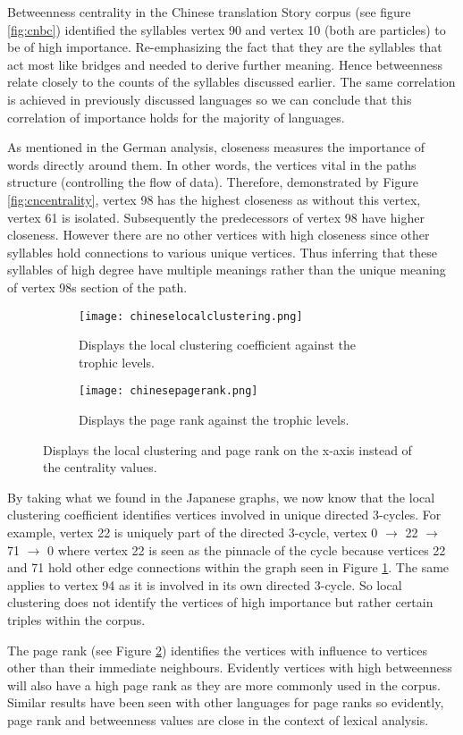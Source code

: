 Betweenness centrality in the Chinese translation Story corpus (see figure \ref{fig:cnbc}) identified the syllables vertex 90 and vertex 10 (both are particles) to be of high importance. Re-emphasizing the fact that they are the syllables that act most like bridges and needed to derive further meaning. Hence betweenness relate closely to the counts of the syllables discussed earlier. The same correlation is achieved in previously discussed languages so we can conclude that this correlation of importance holds for the majority of languages.

As mentioned in the German analysis, closeness measures the importance of words directly around them. In other words, the vertices vital in the paths structure (controlling the flow of data). Therefore, demonstrated by Figure \ref{fig:cncentrality}, vertex 98 has the highest closeness as without this vertex, vertex 61 is isolated. Subsequently the predecessors of vertex 98 have higher closeness. However there are no other vertices with high closeness since other syllables hold connections to various unique vertices. Thus inferring that these syllables of high degree have multiple meanings rather than the unique meaning of vertex 98s section of the path.

\begin{figure}[H]
\centering
\begin{subfigure}{.45\textwidth}
	\hspace{-1cm} 
	\texttt{[image: chineselocalclustering.png]}
	\caption{Displays the local clustering coefficient against the trophic levels.}
	\label{fig:cnlc}
\end{subfigure}
\hfill
\begin{subfigure}{.45\textwidth}
	\hspace{-1cm} 
	\texttt{[image: chinesepagerank.png]}
	\caption{Displays the page rank against the trophic levels.}
	\label{fig:cnpr}
\end{subfigure}
\caption{Displays the local clustering and page rank on the x-axis instead of the centrality values.}
\label{fig:cnother}
\end{figure}

By taking what we found in the Japanese graphs, we now know that the local clustering coefficient identifies vertices involved in unique directed 3-cycles. For example, vertex 22 is uniquely part of the directed 3-cycle, vertex 0 $\rightarrow$ 22 $\rightarrow$ 71 $\rightarrow$ 0 where vertex 22 is seen as the pinnacle of the cycle because vertices 22 and 71 hold other edge connections within the graph seen in Figure \ref{fig:cnlc}. The same applies to vertex 94 as it is involved in its own directed 3-cycle. So local clustering does not identify the vertices of high importance but rather certain triples within the corpus.

The page rank (see Figure \ref{fig:cnpr}) identifies the vertices with influence to vertices other than their immediate neighbours. Evidently vertices with high betweenness will also have a high page rank as they are more commonly used in the corpus. Similar results have been seen with other languages for page ranks so evidently, page rank and betweenness values are close in the context of lexical analysis.

